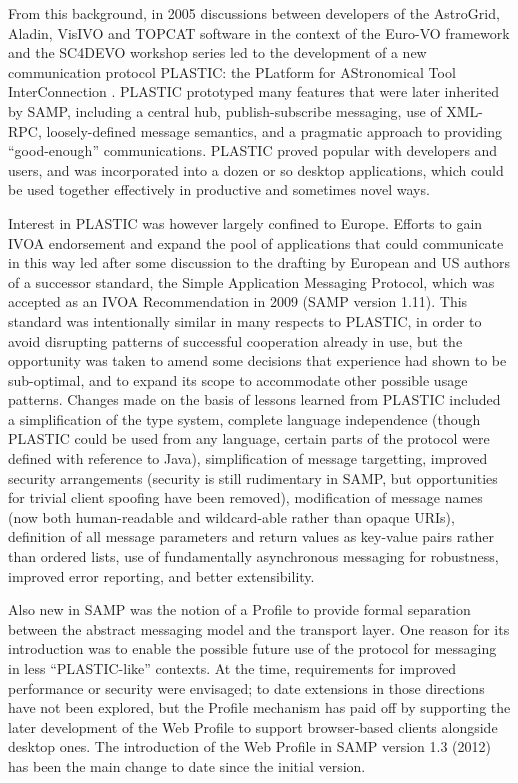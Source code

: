 \documentclass[5p]{elsarticle}
\begin{document}
From this background, in 2005 discussions between developers of
the AstroGrid, Aladin, VisIVO and TOPCAT software
in the context of the Euro-VO
framework and the SC4DEVO workshop series led to the development
of a new communication protocol PLASTIC:
the PLatform for AStronomical Tool InterConnection
\citep{2007ASPC..376..511T,plastic_note}.
PLASTIC prototyped many features that were later inherited by SAMP,
including a central hub, publish-subscribe messaging, use of XML-RPC,
loosely-defined message semantics, and a pragmatic approach
to providing ``good-enough'' communications.
PLASTIC proved popular with developers and users, %
and was incorporated into a dozen or so desktop applications,
which could be used together effectively
in productive and sometimes novel ways.

Interest in PLASTIC was however largely confined to Europe.
Efforts to gain IVOA endorsement and expand the pool
of applications that could communicate in this way
led after some discussion to the drafting by European and US authors
of a successor standard, the Simple Application Messaging Protocol,
which was accepted as an IVOA Recommendation in 2009 (SAMP version 1.11).
This standard was intentionally similar in many respects to PLASTIC,
in order to avoid disrupting patterns of successful
cooperation already in use,
but the opportunity was taken to amend some decisions that experience had
shown to be sub-optimal, and to expand its scope to accommodate
other possible usage patterns.
Changes made on the basis of lessons learned from PLASTIC included
a simplification of the type system,
complete language independence
(though PLASTIC could be used from any language,
certain parts of the protocol were defined with reference to Java),
simplification of message targetting,
improved security arrangements
(security is still rudimentary in SAMP, but opportunities for
trivial client spoofing have been removed),
modification of message names
(now both human-readable and wildcard-able rather than opaque URIs),
definition of all message parameters and return values as
key-value pairs rather than ordered lists,
use of fundamentally asynchronous messaging for robustness,
improved error reporting,
and better extensibility.

Also new in SAMP was the notion of a Profile to provide formal separation
between the abstract messaging model and the transport layer.
One reason for its introduction was to enable the possible future
use of the protocol for messaging in less ``PLASTIC-like'' contexts.
At the time, requirements for improved performance or security were
envisaged; to date extensions in those directions have not been
explored, but the Profile mechanism has paid off by supporting
the later development of the Web Profile to support browser-based
clients alongside desktop ones.
The introduction of the Web Profile in SAMP version 1.3 (2012)
has been the main change to date since the initial version.
\end{document}

